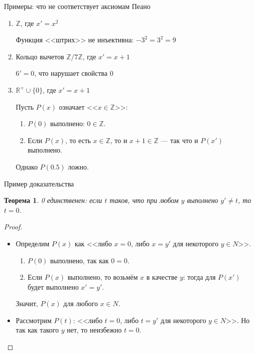 \documentclass[handout]{beamer}
\newtheorem{thm}{Теорема}[section]
\begin{document}
\begin{frame}{Примеры: что не соответствует аксиомам Пеано}
\begin{enumerate}
\item $\mathbb{Z}$, где $x' = x^2$\\\pause

Функция <<штрих>> не инъективна: $-3^2 = 3^2 = 9$\pause

\item Кольцо вычетов $\mathbb{Z}/{7\mathbb{Z}}$, где $x' = x+1$\\\pause

$6' = 0$, что нарушает свойства $0$\pause

\item $\mathbb{R^+}\cup\{0\}$, где $x' = x+1$\\\pause

Пусть $P(x)$ означает <<$x \in \mathbb{Z}$>>:\pause \begin{enumerate}
\item $P(0)$ выполнено: $0 \in \mathbb{Z}$.\pause
\item Если $P(x)$, то есть $x \in \mathbb{Z}$, то и $x+1 \in \mathbb{Z}$ --- так
что и $P(x')$ выполнено.\pause
\end{enumerate}
Однако $P(0.5)$ ложно.
\end{enumerate}
\end{frame}

\begin{frame}{Пример доказательства}
\begin{thm}0 единственен: если $t$ таков, что при любом $y$ 
выполнено $y' \ne t$, то $t = 0$.
\end{thm}\pause
\begin{proof}

\begin{itemize}
\item Определим $P(x)$ как <<либо $x = 0$, либо $x = y'$ для некоторого $y \in N$>>.\pause
\begin{enumerate}
\item $P(0)$ выполнено, так как $0 = 0$.\pause
\item Если $P(x)$ выполнено, то возьмём $x$ в качестве $y$: тогда для $P(x')$
будет выполнено $x' = y'$.\pause
\end{enumerate}
Значит, $P(x)$ для любого $x \in N$.\pause

\item Рассмотрим $P(t)$: <<либо $t = 0$, либо $t = y'$ для некоторого $y \in N$>>.
Но так как такого $y$ нет, то неизбежно $t = 0$.
\end{itemize}
\end{proof}
\end{frame}
\end{document}
